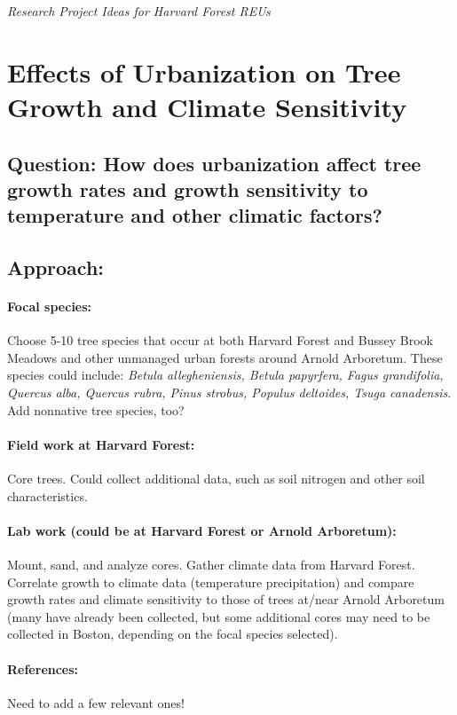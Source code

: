 \documentclass[11pt]{article}
\begin{document}
\noindent \emph{\LARGE Research Project Ideas for Harvard Forest REUs}

\section{Effects of Urbanization on Tree Growth and Climate Sensitivity}
\subsection{Question: How does urbanization affect tree growth rates and growth sensitivity to temperature and other climatic factors?}
\subsection{Approach:}
\paragraph {Focal species:} Choose 5-10 tree species that occur at both Harvard Forest and Bussey Brook Meadows and other unmanaged urban forests around Arnold Arboretum. These species could include: \emph{Betula allegheniensis, Betula papyrfera, Fagus grandifolia, Quercus alba, Quercus rubra, Pinus strobus, Populus deltoides, Tsuga canadensis}. Add nonnative tree species, too?
\paragraph {Field work at Harvard Forest:} Core trees. Could collect additional data, such as soil nitrogen and other soil characteristics. 
\paragraph {Lab work (could be at Harvard Forest or Arnold Arboretum):} Mount, sand, and analyze cores. Gather climate data from Harvard Forest. Correlate growth to climate data (temperature precipitation) and compare growth rates and climate sensitivity to those of trees at/near Arnold Arboretum (many have already been collected, but some additional cores may need to be collected in 
Boston, depending on the focal species selected).
\paragraph {References:} Need to add a few relevant ones!

\section{}
\subsection{}
\paragraph {}

\end{document}

